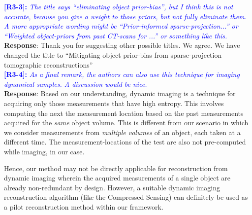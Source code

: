 \documentclass[11pt]{article}
\begin{document}
\vspace{0.5cm}\textcolor{blue}{\textbf{[R3-3]:} \textit{The title says ``eliminating object prior-bias'', but I think this is not accurate, because you give a weight to those priors, but not fully eliminate them. A more appropriate wording might be ``Prior-informed sparse-projection...'' or ``Weighted object-priors from past CT-scans for ...'' or something like this.}}\\

\textbf{Response}: Thank you for suggesting other possible titles. We
agree. We have changed the title to ``Mitigating object prior-bias from sparse-projection tomographic reconstructions''\\


\vspace{0.5cm}\textcolor{blue}{\textbf{[R3-4]:} \textit{As a final remark, the authors can also use this technique for imaging dynamical samples. A discussion would be nice.}}\\

\textbf{Response}: Based on our understanding, dynamic imaging is a technique for acquiring only those measurements that have high entropy. This involves computing the next the measurement location based on the past measurements acquired for the \textit{same} object volume. This is different from our scenario in which we consider measurements from \textit{multiple volumes} of an object, each taken at a different time. The measurement-locations of the test are also not pre-computed while imaging, in our case. 

Hence, our method may not be directly applicable for reconstruction from dynamic imaging wherein the acquired measurements of a single object are already non-redundant by design. However, a suitable dynamic imaging reconstruction algorithm (like the Compressed Sensing)  can definitely be used as a pilot reconstruction method within our framework. 



    
  
\end{document}
